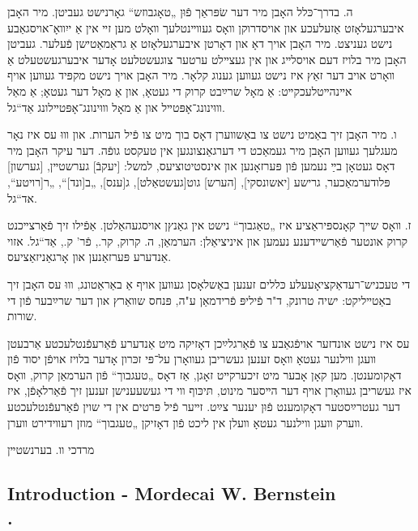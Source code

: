 \documentclass{article}
\begin{document}
\begin{pairs}
\begin{Rightside}
\begin{RTL}
\begin{hebrew}
ה. בדרך־כּלל האָבן מיר דער שׂפּראַך פֿוּן „טאָגבוזש“ גאָרנישט געביטן.
מיר האָבן איבערגעלאָזט אַזעלעכע און אויסדרוקן װאָס געװײנטלעך
װאָלט מען זײ אין אַ ייִװאָ־אויסגאַבע נישט געניצט. מיר האָבן אויך דאָ און
דאָרטן איבערגעלאָזט אַ גראַמאַטישן פֿעלער. געביטן האָבן מיר בלויז דעם
אויסלײג און אין געצײלט ערטער צוגעשטלעט אָדער איבערגעשטעלט אַ װאָרט
אויב דער זאַץ איז נישט געװען גענוג קלאָר. מיר האָבן אויך נישט מקפּיד
געװען אויף אײנהײטלעכקײט: אַ מאָל שרײַבט קרוק די געטאָ, און אַ מאָל
 דער געטאָ; אַ מאַל  װוּינונג־אָפּטײל און אַ מאָל װוּינונג־אָפּטײלונג אַד“גל.
 
 ו. מיר האָבן זיך באַמיט נישט צו באַשװערן דאָס בוך מיט צו פֿיל הערות.
 און װוּ עס איז נאָר מעגלעך געװען האָבן מיר געמאַכט די דערגאַנצונגען אין
 טעקסט גופֿה. דער עיקר האָבן מיר דאָס געטאָן בײַ נעמען פֿון פּערזאָנען און
 אינסטיטוציעס, למשל: [יעקבֿ] גערשטײן, [גערשון] פּלודערמאַכער, גרישע [יאשונסקי], [הערש] גוט[געשטאַלט], ג[ענס], „ב[ונד]“, „ר[רויטע“, אד“גל.
 
ז. װאָס שײך קאָנספּיראַציע איז „טאַגבוך“ נישט אין גאַנץן אויסגעהאַלטן.
אַפֿילו זיך פֿאַרצײכנט קרוק אונטער פֿאַרשײדענע נעמען און איניציאַלן:
הערמאַן, ה. קרוק, קר., פֿר' ק., אַד“גל. אזוי אַנדערע פּערזאַנען און אָרגאַניזאַציעס.

די טעכניש־רעדאַקציאָעעלע כּללים זענען באַשלאָסן געװען אויף אַ
באַראַטונג, װוּ עס האָבן זיך באַטײליקט: ישיה טרונק, ד"ר פֿיליפּ פֿרידמאַן ע"ה,
פּנחס שװאַרץ און דער שרײַבער פֿון די שורות.

עס איז נישט אונדזער אויפֿגאַבע צו פֿאַרגלײַכן דאָזיקה מיט
אַנדערע פֿאַרעפֿנטלעכטע אַרבעטן װעגן װילנער געטאָ װאָס זענען געשריבן
געװאָרן על־פּי זכּרון אָדער בלויז אויפֿן יסוד פֿון דאָקומענטן. מען קאָן אָבער
מיט זיכערקײט זאָגן, אַז דאָס „טעגבוך“ פֿון הערמאַן קרוק, װאָס איז געשריבן
געװאָרן אויף דער הײסער מינוט, תּיכּוף װי די געשעענישן זענען זיך פֿאַרלאָפֿן,
איז דער געטרײַסטער דאָקומענט פֿוּן יענער צײַט. זײער פֿיל פּרטים אין די
שוין פֿאַרעפֿנטלעכטע װערק װעגן װילנער געטאָ װעלן אין ליכט פֿון דאָזיקן
„טעגבוך“ מוזן רעװידירט װערן.

מרדכי װ. בערנשטײן

\endnumbering
\end{hebrew}
\end{RTL}
\end{Rightside}


\begin{Leftside}
\begin{english}
\section{
Introduction - Mordecai W. Bernstein \\  .  }
\beginnumbering
\autopar


\end{english}
\end{Leftside}
\end{pairs}
\end{document}
